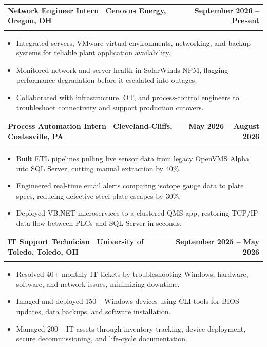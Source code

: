 \documentclass[letterpaper,11pt]{article}
\makeatletter
\newcommand{\resumeItem}[1]{\item\small{#1 \vspace{-4pt}}}  %
\newcommand{\resumeSubheading}[4]{
    \vspace{-2pt}\item
    \begin{tabular*}{1.0\textwidth}[t]{l@{\extracolsep{\fill}}r}
        \textbf{#1} & \textbf{\small #2} \\
        \textit{\small#3} & \textit{\small #4}
    \end{tabular*}\vspace{-7pt}
}
\newcommand{\resumeItemListStart}{\begin{itemize}}
\newcommand{\resumeItemListEnd}{\end{itemize}\vspace{-7pt}}  %
\makeatother
\begin{document}
\resumeSubheading
{\textbf{Network Engineer Intern} \textnormal{\textbar\ Cenovus Energy, Oregon, OH}}{September 2026 -- Present}
{}{}
\vspace{-0.6cm}
\resumeItemListStart
\resumeItem{Integrated servers, VMware virtual environments, networking, and backup systems for reliable plant application availability.}
\vspace{0.15cm}
\resumeItem{Monitored network and server health in SolarWinds NPM, flagging performance degradation before it escalated into outages.}
\vspace{0.15cm}
\resumeItem{Collaborated with infrastructure, OT, and process-control engineers to troubleshoot connectivity and support production cutovers.}
\vspace{0.15cm}
\resumeItemListEnd

\resumeSubheading
{\textbf{Process Automation Intern} \textnormal{\textbar\ Cleveland-Cliffs, Coatesville, PA}}{May 2026 -- August 2026}
{}{}
\vspace{-0.6cm}
\resumeItemListStart
\resumeItem{Built ETL pipelines pulling live sensor data from legacy OpenVMS Alpha into SQL Server, cutting manual extraction by 40\%.}
\vspace{0.15cm}
\resumeItem{Engineered real-time email alerts comparing isotope gauge data to plate specs, reducing defective steel plate escapes by 30\%.}
\vspace{0.15cm}
\resumeItem{Deployed VB.NET microservices to a clustered QMS app, restoring TCP/IP data flow between PLCs and SQL Server in seconds.}
\vspace{0.15cm}
\resumeItemListEnd

\resumeSubheading
{\textbf{IT Support Technician} \textnormal{\textbar\ University of Toledo, Toledo, OH}}{September 2025 -- May 2026}
{}{}
\vspace{-0.6cm}
\resumeItemListStart
\resumeItem{Resolved 40+ monthly IT tickets by troubleshooting Windows, hardware, software, and network issues, minimizing downtime.}
\vspace{0.15cm}
\resumeItem{Imaged and deployed 150+ Windows devices using CLI tools for BIOS updates, data backups, and software installation.}
\vspace{0.15cm}
\resumeItem{Managed 200+ IT assets through inventory tracking, device deployment, secure decommissioning, and life-cycle documentation.}
\vspace{0.15cm}
\resumeItemListEnd
\end{document}

